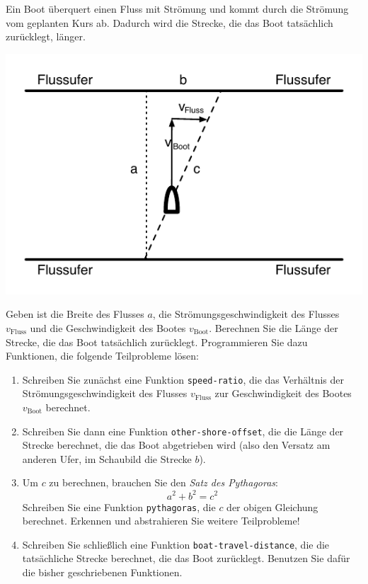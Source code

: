 \begin{aufgabe}

 Ein Boot überquert einen Fluss mit Strömung und
  kommt durch die Strömung vom geplanten Kurs ab.  Dadurch wird die
  Strecke, die das Boot tatsächlich zurücklegt, länger.

  \begin{center}
    \includegraphics{riverboat}
  \end{center}

  Geben ist die Breite des Flusses $a$, die Strömungsgeschwindigkeit
  des Flusses $v_{\text{Fluss}}$ und die Geschwindigkeit des Bootes
  $v_{\text{Boot}}$.  Berechnen Sie die Länge der Strecke, die das
  Boot tatsächlich zurücklegt.  Programmieren Sie dazu Funktionen, die
  folgende Teilprobleme lösen:

  \begin{enumerate}
  \item Schreiben Sie zunächst eine Funktion \texttt{speed-ratio}, die
    das Verhältnis der Strömungsgeschwindigkeit des Flusses
    $v_{\text{Fluss}}$ zur Geschwindigkeit des Bootes
    $v_{\text{Boot}}$ berechnet.

  \item Schreiben Sie dann eine Funktion \texttt{other-shore-offset},
    die die Länge der Strecke berechnet, die das Boot abgetrieben wird
    (also den Versatz am anderen Ufer, im Schaubild die Strecke $b$).

  \item Um $c$ zu berechnen, brauchen Sie den \textit{Satz des
      Pythagoras}:
    \begin{displaymath}
      a^2 + b^2 = c^2
    \end{displaymath}
    Schreiben Sie eine Funktion \texttt{pythagoras}, die $c$ der
    obigen Gleichung berechnet.  Erkennen und abstrahieren Sie weitere
    Teilprobleme!

  \item Schreiben Sie schließlich eine Funktion
    \texttt{boat-travel-distance}, die die tatsächliche Strecke
    berechnet, die das Boot zurücklegt.  Benutzen Sie dafür die bisher
    geschriebenen Funktionen.
  \end{enumerate}
\end{aufgabe}

